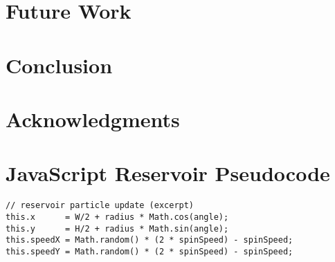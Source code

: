 \documentclass[11pt]{article}
\begin{document}
\section{Future Work}\label{sec:future-work}

\section{Conclusion}\label{sec:conclusion}

\section*{Acknowledgments}




\appendix

\section{JavaScript Reservoir Pseudocode}\label{app:pseudocode}
\begin{verbatim}
// reservoir particle update (excerpt)
this.x      = W/2 + radius * Math.cos(angle);
this.y      = H/2 + radius * Math.sin(angle);
this.speedX = Math.random() * (2 * spinSpeed) - spinSpeed;
this.speedY = Math.random() * (2 * spinSpeed) - spinSpeed;
\end{verbatim}
\end{document}
